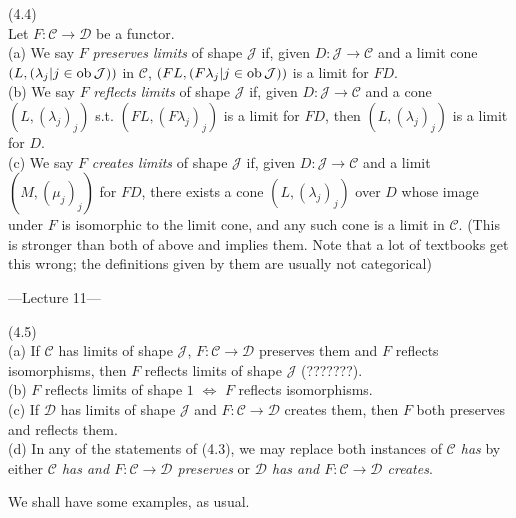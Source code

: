 \documentclass[a4paper]{article}
\begin{document}
\begin{defi} (4.4)\\
    Let $F: \mathcal{C} \to \mathcal{D}$ be a functor.\\
    (a) We say $F$ \emph{preserves limits} of shape $\mathcal{J}$ if, given $D:\mathcal{J} \to \mathcal{C}$ and a limit cone $(L,(\lambda_j|j \in \operatorname{ob}\mathcal{J}))$ in $\mathcal{C}$, $(FL, (F\lambda_j | j \in \operatorname{ob} \mathcal{J}))$ is a limit for $FD$.\\
    (b) We say $F$ \emph{reflects limits} of shape $\mathcal{J}$ if, given $D:\mathcal{J} \to \mathcal{C}$ and a cone $(L,(\lambda_j)_j)$ s.t. $(FL,(F\lambda_j)_j)$ is a limit for $FD$, then $(L,(\lambda_j)_j)$ is a limit for $D$.\\
    (c) We say $F$ \emph{creates limits} of shape $\mathcal{J}$ if, given $D : \mathcal{J} \to \mathcal{C}$ and a limit $(M,(\mu_j)_j)$ for $FD$, there exists a cone $(L,(\lambda_j)_j)$ over $D$ whose image under $F$ is isomorphic to the limit cone, and any such cone is a limit in $\mathcal{C}$. (This is stronger than both of above and implies them. Note that a lot of textbooks get this wrong; the definitions given by them are usually not categorical)
\end{defi}

---Lecture 11---

\begin{rem} (4.5)\\
    (a) If $\mathcal{C}$ has limits of shape $\mathcal{J}$, $F: \mathcal{C} \to \mathcal{D}$ preserves them and $F$ reflects isomorphisms, then $F$ reflects limits of shape $\mathcal{J}$ (???????).\\
    (b) $F$ reflects limits of shape $1$ $\iff$ $F$ reflects isomorphisms.\\
    (c) If $\mathcal{D}$ has limits of shape $\mathcal{J}$ and $F:\mathcal{C} \to \mathcal{D}$ creates them, then $F$ both preserves and reflects them.\\
    (d) In any of the statements of (4.3), we may replace both instances of \emph{$\mathcal{C}$ has} by either \emph{$\mathcal{C}$ has and $F:\mathcal{C} \to \mathcal{D}$ preserves} or \emph{$\mathcal{D}$ has and $F:\mathcal{C} \to \mathcal{D}$ creates}.
\end{rem}

We shall have some examples, as usual.
\end{document}
